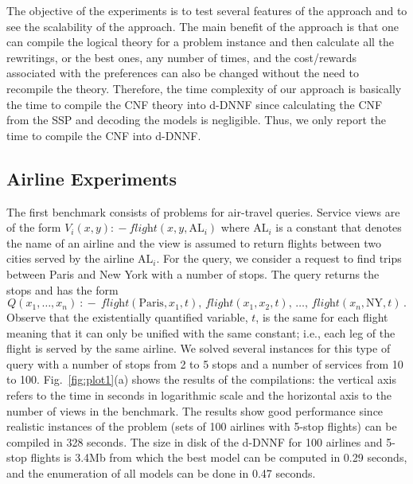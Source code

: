 \documentclass{llncs}
\newcommand{\qrule}{:\!\!-}
\newcommand{\flight}{\textit{flight}}
\newcommand{\PA}{\text{Paris}}
\newcommand{\NY}{\text{NY}}
\newcommand{\AL}{\text{AL}}
\begin{document}
The objective of the experiments is to test several features of the 
approach and to see the scalability of the approach.
The main benefit of the approach is
that one can compile the logical theory for a problem instance and then
calculate all the rewritings, or the best ones, any number of times,
and the cost/rewards associated with the preferences can also be changed
without the need to recompile the theory.
Therefore, the time complexity of our approach is basically the time to
compile the CNF theory into d-DNNF since calculating the CNF from the SSP
and decoding the models is negligible.
Thus, we only report the time to compile the CNF into d-DNNF.

\subsection{Airline Experiments}

The first benchmark consists of problems for air-travel queries.
Service views are of the form $V_i(x,y)\qrule \flight(x,y,\AL_i)$
where $\AL_i$ is a constant that denotes the name of an airline
and the view is assumed to return flights between two cities served
by the airline $\AL_i$. For the query, we consider a request to
find trips between Paris and New York with a number of stops.
The query returns the stops and has the form
\[ Q(x_1,\ldots,x_n)\ \qrule\ \flight(\PA,x_1,t),\,\flight(x_1,x_2,t),\,\ldots,\,\flight(x_n,\NY,t)\,. \]
Observe that the existentially quantified variable, $t$, is the same
for each flight meaning that it can only be unified with the same
constant; i.e., each leg of the flight is served by the same airline.
We solved several instances for this type of query with a number of stops
from 2 to 5 stops and a number of services from 10 to 100.
Fig.~\ref{fig:plot1}(a) shows the results of the compilations:
the vertical axis refers to the time in seconds in logarithmic
scale and the horizontal axis to the number of views in the benchmark.
The results show good performance since realistic instances of the
problem (sets of 100 airlines with 5-stop flights) can be compiled
in 328 seconds. The size in disk of the d-DNNF for 100 airlines and
5-stop flights is 3.4Mb from which the best model can be computed
in 0.29 seconds, and the enumeration of all models can be done
in 0.47 seconds.
\end{document}
